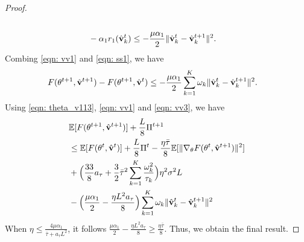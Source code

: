 \documentclass[twoside,journal]{IEEEtran}
\def\VectorFont{\bf}
\newcommand{\vv}{{\VectorFont v}}
\begin{document}
\begin{proof}
\begin{align}
\\
&-\alpha_1  r_1(\hat{\vv}_k^{t})\leq
-\frac{\mu\alpha_1}{2}\|
\hat{\vv}_{k}^{t}-\hat{\vv}_{k}^{t+1}\|^2.
\end{align}
Combing \eqref{eqn: vv1} and \eqref{eqn: ss1}, we have
\begin{align}
\label{eqn: vv3} F(\theta^{t+1},\hat{\vv}^{t+1})-F(\theta^{t+1},\hat{\vv}^t)&\leq
-\frac{\mu\alpha_1}{2}\sum_{k=1}^K\omega_k\|
\hat{\vv}_{k}^{t}-\hat{\vv}_{k}^{t+1}\|^2.
\end{align}
Using \eqref{eqn: theta_v113}, \eqref{eqn: vv1} and \eqref{eqn: vv3}, we have
\begin{align}\label{eqn: theta_vvv}
\nonumber&\mathbb{E}[F(\theta^{t+1},\hat{\vv}^{t+1})]+\frac{L}{8}\Pi^{t+1}\\
\nonumber&\leq \mathbb{E}[F(\theta^{t},\hat{\vv}^t)]+\frac{L}{8}\Pi^{t}
-\frac{\eta\bar{\tau}}{8}\mathbb{E}[\|\nabla_{\theta}F(\theta^t,\hat{\vv}^{t+1})\|^2]\\
\nonumber&+\Big(\frac{33}{8}a_{\tau}
+\frac{3}{2}\bar{\tau}^2\sum_{k=1}^K\frac{\omega_k^2}{\tau_k}\Big)\eta^2\sigma^2L \\
&-\Big(\frac{\mu\alpha_1}{2}-\frac{\eta L^2a_{\tau}}{8}\Big)\sum_{k=1}^K\omega_k\|
\hat{\vv}_{k}^{t}-\hat{\vv}_{k}^{t+1}\|^2
\end{align}
 When $\eta\leq \frac{4\mu\alpha_1}{\bar{\tau}+a_{\tau}L^2}$, it follows $\frac{\mu\alpha_1}{2}-\frac{\eta L^2a_{\tau}}{8}\geq \frac{\eta\bar{\tau}}{8}$.
 Thus, we obtain the
final result.
\end{proof}
\end{document}

